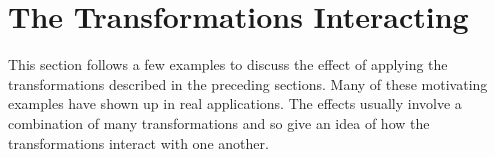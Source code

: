 % 




\section{The Transformations Interacting}

This section follows a few examples to discuss the effect of applying the
transformations described in the preceding sections. Many of these motivating
examples have shown up in real applications. The effects usually involve a
combination of many transformations and so give an idea of how the
transformations interact with one another.

